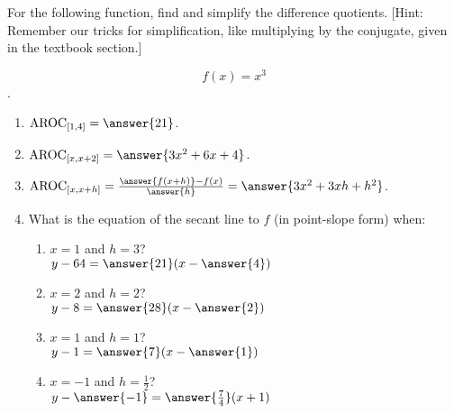 \documentclass{ximera}
\author{Elizabeth Campolongo}
\begin{document}
\begin{exercise}

For the following function, 
find and simplify the difference quotients. [Hint: Remember our tricks for simplification, like multiplying by the conjugate, given in the textbook section.]

$$f(x)= x^3$$.

\begin{enumerate}
\item $\av_{[1,4]} = \answer{21}$.


\item $\av_{[x,x+2]} =  \answer{3x^2+6x+4}$.


\item $\av_{[x,x+h]} = \frac{\answer{f(x+h)}-f(x)}{\answer{h}} = \answer{3x^2+3xh+h^2}$.  


\item What is the equation of the secant line to $f$ (in point-slope form) when: 
\begin{enumerate}
\item  $x = 1$ and $h=3$?\\
$y-64= \answer{21}(x-\answer{4})$

\item $x = 2$ and $h=2$? \\
$y-8= \answer{28}(x-\answer{2})$

\item  $x = 1$ and $h=1$?\\
$y-1= \answer{7}(x-\answer{1})$

\item $x=-1$ and $h = \frac{1}{2}$? \\
$y-\answer{-1}= \answer{\frac{7}{4}}(x+1)$
\end{enumerate}

\end{enumerate}
\end{exercise}
\end{document}
